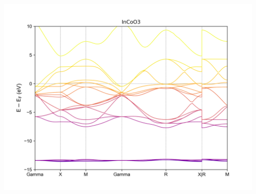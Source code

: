 \documentclass[12pt, letterpaper]{article}
\newcommand*{\1}{\hspace{1pt}}
\begin{document}
%
            

    \begin{adjustbox}{center,caption={Band Structure Of InCoO3},label={somelabel},nofloat=figure,vspace=\bigskipamount}
        \includegraphics[width=\textwidth]{bandCo}
    \end{adjustbox}
\end{document}
